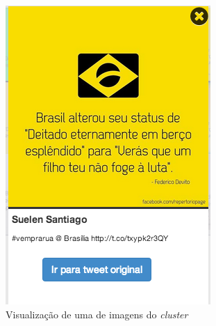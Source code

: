 \begin{figure}[h]
\begin{subfigure}[b]{0.32\textwidth}
	\includegraphics[width=0.9\linewidth]{./figures/olhopassarinho/c2_ex2_im100_1718}
	\caption{ Visualização de uma de imagens do \textit{cluster} }
	\label{subfig:im02}
	\end{subfigure}
	~
	\begin{subfigure}[b]{0.32\textwidth}
	\centering

\end{subfigure}
\end{figure}
